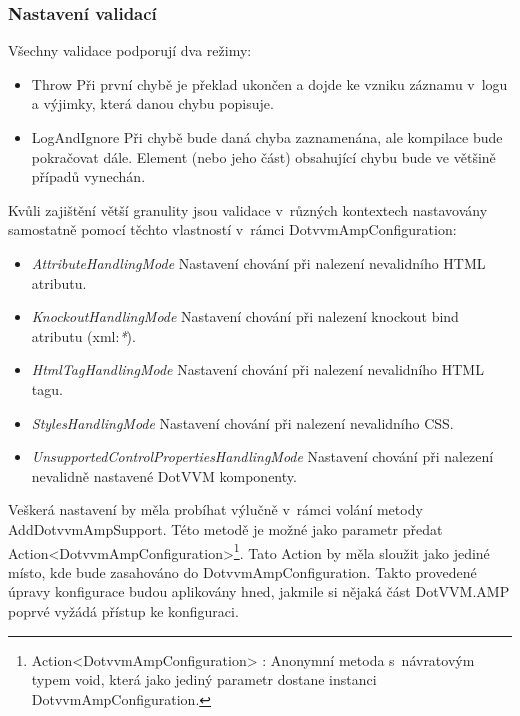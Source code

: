 \subsubsection{Nastavení validací} \label{validationModes}
Všechny validace podporují dva režimy:
\begin{itemize}
    \item Throw \newline
    Při první chybě je překlad ukončen a dojde ke vzniku záznamu v~logu a výjimky, která danou chybu popisuje.
    \item LogAndIgnore \newline
    Při chybě bude daná chyba zaznamenána, ale kompilace bude pokračovat dále. Element (nebo jeho část) obsahující chybu bude ve většině případů vynechán.
\end{itemize}
Kvůli zajištění větší granulity jsou validace v~různých kontextech nastavovány samostatně pomocí těchto vlastností v~rámci DotvvmAmpConfiguration: 
\begin{itemize}
    \item \textit{AttributeHandlingMode} \newline
    Nastavení chování při nalezení nevalidního HTML atributu.
    \item \textit{KnockoutHandlingMode}\newline
    Nastavení chování při nalezení knockout bind atributu (xml:\textit{*}).
    \item \textit{HtmlTagHandlingMode}\newline
    Nastavení chování při nalezení nevalidního HTML tagu.
    \item \textit{StylesHandlingMode}\newline
    Nastavení chování při nalezení nevalidního CSS.
    \item \textit{UnsupportedControlPropertiesHandlingMode}\newline
    Nastavení chování při nalezení nevalidně nastavené DotVVM komponenty.
\end{itemize}

Veškerá nastavení by měla probíhat výlučně v~rámci volání metody AddDotvvmAmpSupport. Této metodě je možné jako parametr předat Action<DotvvmAmpConfiguration>\footnote{Action<DotvvmAmpConfiguration> : Anonymní metoda s~návratovým typem void, která jako jediný parametr dostane instanci DotvvmAmpConfiguration.}. Tato Action by měla sloužit jako jediné místo, kde bude zasahováno do DotvvmAmpConfiguration. Takto provedené úpravy konfigurace budou aplikovány hned, jakmile si nějaká část DotVVM.AMP poprvé vyžádá přístup ke konfiguraci.

